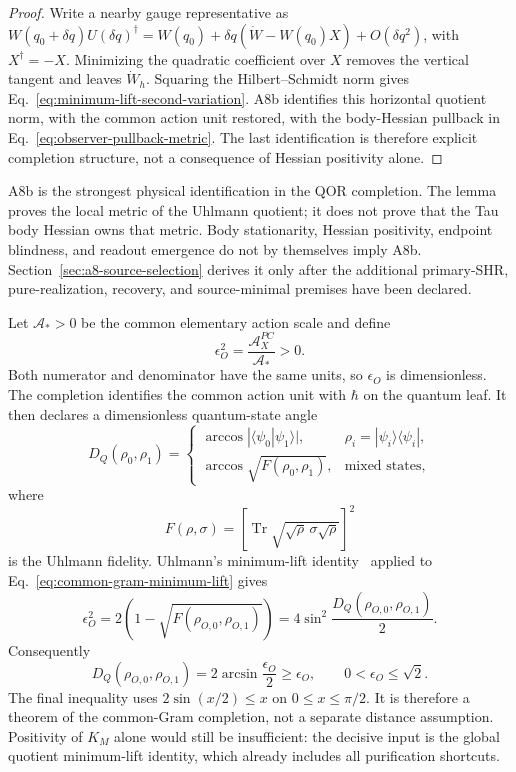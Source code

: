 \documentclass[11pt]{article}
\begin{document}
\begin{proof}
Write a nearby gauge representative as
\(W(q_0+\delta q)U(\delta q)^\dagger
=W(q_0)+\delta q(\dot W-W(q_0)X)+O(\delta q^2)\), with
\(X^\dagger=-X\).  Minimizing the quadratic coefficient over \(X\) removes the
vertical tangent and leaves \(\dot W_h\).  Squaring the Hilbert--Schmidt norm
gives Eq.~\eqref{eq:minimum-lift-second-variation}.  A8b identifies this
horizontal quotient norm, with the common action unit restored, with the
body-Hessian pullback in Eq.~\eqref{eq:observer-pullback-metric}.  The last
identification is therefore explicit completion structure, not a consequence
of Hessian positivity alone.
\end{proof}

A8b is the strongest physical identification in the QOR completion.  The
lemma proves the local metric of the Uhlmann quotient; it does not prove that
the Tau body Hessian owns that metric.  Body stationarity, Hessian positivity,
endpoint blindness, and readout emergence do not by themselves imply A8b.
Section~\ref{sec:a8-source-selection} derives it only after the additional
primary-SHR, pure-realization, recovery, and source-minimal premises have been
declared.

Let \(\mathcal A_*>0\) be the common
elementary action scale and define
\begin{equation}
  \epsilon_O^2
  =\frac{\mathcal A_X^{PC}}{\mathcal A_*}>0.
  \label{eq:epsilon-def}
\end{equation}
Both numerator and denominator have the same units, so \(\epsilon_O\) is
dimensionless.  The completion identifies the common action unit with
\(\hbar\) on the quantum leaf.  It then declares a dimensionless quantum-state
angle
\begin{equation}
  D_Q(\rho_0,\rho_1)=
  \begin{cases}
    \arccos|\langle\psi_0|\psi_1\rangle|,
      & \rho_i=|\psi_i\rangle\langle\psi_i|,\\[2pt]
    \arccos\sqrt{F(\rho_0,\rho_1)},
      & \text{mixed states},
  \end{cases}
  \label{eq:quantum-record-angle}
\end{equation}
where
\[
  F(\rho,\sigma)=
  \left[\operatorname{Tr}\sqrt{\sqrt\rho\,\sigma\sqrt\rho}\right]^2
\]
is the Uhlmann fidelity.  Uhlmann's minimum-lift identity~\cite{Uhlmann1976} applied to
Eq.~\eqref{eq:common-gram-minimum-lift} gives
\begin{equation}
 \epsilon_O^2
 =2\left(1-\sqrt{F(\rho_{O,0},\rho_{O,1})}\right)
 =4\sin^2\!\frac{D_Q(\rho_{O,0},\rho_{O,1})}{2}.
 \label{eq:gram-bures-identity}
\end{equation}
Consequently
\begin{equation}
 D_Q(\rho_{O,0},\rho_{O,1})
 =2\arcsin\frac{\epsilon_O}{2}
 \geq\epsilon_O,
 \qquad 0<\epsilon_O\leq\sqrt2.
  \label{eq:record-distance-threshold}
\end{equation}
The final inequality uses \(2\sin(x/2)\leq x\) on
\(0\leq x\leq\pi/2\).  It is therefore a theorem of the common-Gram
completion, not a separate distance assumption.  Positivity of \(K_M\) alone
would still be insufficient: the decisive input is the global quotient
minimum-lift identity, which already includes all purification shortcuts.
\end{document}
